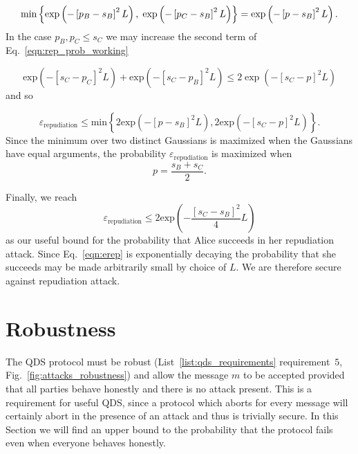 \begin{equation}
\text{min}\left\{\text{exp}\left(- \left[p_B - s_B\right]^2L\right), \; \text{exp}\left(- \left[p_C - s_B\right]^2L\right)\right\} = \text{exp}\left(-\left[p - s_B\right]^2L\right). \notag
\end{equation}
In the case $p_B, p_C \le s_C$ we may increase the second term of Eq.~\ref{eqn:rep_prob_working} 

\begin{equation}
\text{exp}\left(- \left[s_C - p_C\right]^2 L \right) + \text{exp}\left(- \left[s_C - p_B\right]^2 L \right) \le 2 \exp\left( - \left[s_C - p\right]^2 L\right)
\end{equation}
and so

\begin{equation}
\varepsilon_{\text{repudiation}} \le \text{min}\left\{ 2 \text{exp}\left( - \left[p - s_B\right]^2 L \right), 2 \text{exp}\left( - \left[s_C - p\right]^2 L \right) \right\}.
\end{equation}
Since the minimum over two distinct Gaussians is maximized when the Gaussians have equal arguments, the probability $\varepsilon_{\text{repudiation}}$ is maximized when 
\begin{equation}
p = \frac{s_B + s_C}{2}.
\end{equation}

\noindent Finally, we reach
\begin{equation}\label{eqn:erep}
\varepsilon_{\text{repudiation}} \le 2 \text{exp}\left( - \frac{\left[s_C - s_B\right]^2}{4} L\right)
\end{equation}
as our useful bound for the probability that Alice succeeds in her repudiation attack. Since Eq.~\ref{eqn:erep} is exponentially decaying the probability that she succeeds may be made arbitrarily small by choice of $L$. We are therefore secure against repudiation attack.




\section{Robustness}\label{sec:qds_security_robustness}
The QDS protocol must be robust (List~\ref{list:qds_requirements} requirement~$5$, Fig.~\ref{fig:attacks_robustness}) and allow the message $m$ to be accepted provided that all parties behave honestly and there is no attack present. This is a requirement for useful QDS, since a protocol which aborts for every message will certainly abort in the presence of an attack and thus is trivially secure. In this Section we will find an upper bound to the probability that the protocol fails even when everyone behaves honestly.

